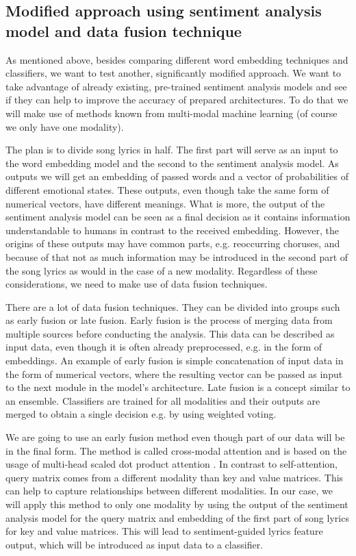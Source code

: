 \subsection{Modified approach using sentiment analysis model and data fusion technique}

As mentioned above, besides comparing different word embedding techniques and classifiers, we want to test another, significantly modified approach. We want to take advantage of already existing, pre-trained sentiment analysis models and see if they can help to improve the accuracy of prepared architectures. To do that we will make use of methods known from multi-modal machine learning (of course we only have one modality).

The plan is to divide song lyrics in half. The first part will serve as an input to the word embedding model and the second to the sentiment analysis model. As outputs we will get an embedding of passed words and a vector of probabilities of different emotional states. These outputs, even though take the same form of numerical vectors, have different meanings. What is more, the output of the sentiment analysis model can be seen as a final decision as it contains information understandable to humans in contrast to the received embedding. However, the origins of these outputs may have common parts, e.g. reoccurring choruses, and because of that not as much information may be introduced in the second part of the song lyrics as would in the case of a new modality. Regardless of these considerations, we need to make use of data fusion techniques.

There are a lot of data fusion techniques. They can be divided into groups such as early fusion or late fusion. Early fusion is the process of merging data from multiple sources before conducting the analysis. This data can be described as input data, even though it is often already preprocessed, e.g. in the form of embeddings. An example of early fusion is simple concatenation of input data in the form of numerical vectors, where the resulting vector can be passed as input to the next module in the model's architecture. Late fusion is a concept similar to an ensemble. Classifiers are trained for all modalities and their outputs are merged to obtain a single decision e.g. by using weighted voting.

We are going to use an early fusion method even though part of our data will be in the final form. The method is called cross-modal attention \cite{Krishna2020MultimodalER} and is based on the usage of multi-head scaled dot product attention \cite{vaswani2017attention}. In contrast to self-attention, query matrix comes from a different modality than key and value matrices. This can help to capture relationships between different modalities. In our case, we will apply this method to only one modality by using the output of the sentiment analysis model for the query matrix and embedding of the first part of song lyrics for key and value matrices. This will lead to sentiment-guided lyrics feature output, which will be introduced as input data to a classifier.

